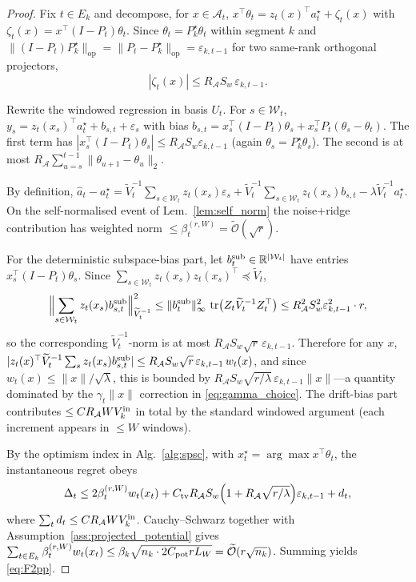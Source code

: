 \documentclass{article}
\newcommand{\R}{\mathbb{R}}
\newcommand{\op}{\mathrm{op}}
\newcommand{\cA}{\mathcal{A}}
\newcommand{\cW}{\mathcal{W}}
\newcommand{\tilO}{\widetilde{\mathcal{O}}}
\DeclareMathOperator{\tr}{tr}
\begin{document}
\begin{proof}
Fix $t\in E_k$ and decompose, for $x\in\cA_t$,
$x^\top\theta_t = z_t(x)^\top a_t^\star + \zeta_t(x)$ with
$\zeta_t(x)=x^\top(I-P_t)\theta_t$. Since $\theta_t=P_k^\star\theta_t$
within segment $k$ and $\|(I-P_t)P_k^\star\|_{\op}=\|P_t-P_k^\star\|_{\op}=\varepsilon_{k,t-1}$
for two same-rank orthogonal projectors,
\begin{equation}|\zeta_t(x)|\le R_\cA S_w\,\varepsilon_{k,t-1}.\label{eq:zeta}\end{equation}

Rewrite the windowed regression in basis $U_t$. For $s\in\cW_t$,
$y_s=z_t(x_s)^\top a_t^\star+b_{s,t}+\varepsilon_s$ with bias
$b_{s,t}=x_s^\top(I-P_t)\theta_s + x_s^\top P_t(\theta_s-\theta_t)$.
The first term has $|x_s^\top(I-P_t)\theta_s|\le R_\cA S_w\varepsilon_{k,t-1}$
(again $\theta_s=P_k^\star\theta_s$). The second is at most
$R_\cA\sum_{u=s}^{t-1}\|\theta_{u+1}-\theta_u\|_2$.

By definition,
$\widehat a_t-a_t^\star
= \widetilde V_t^{-1}\sum_{s\in\cW_t}z_t(x_s)\varepsilon_s
+ \widetilde V_t^{-1}\sum_{s\in\cW_t}z_t(x_s)b_{s,t}
- \lambda\widetilde V_t^{-1}a_t^\star.$
On the self-normalised event of Lem.~\ref{lem:self_norm} the noise+ridge contribution has weighted norm
$\le \beta_t^{(r,W)}=\tilO(\sqrt r)$.

For the deterministic subspace-bias part, let $b_t^{\rm sub}\in\R^{|\cW_t|}$
have entries $x_s^\top(I-P_t)\theta_s$. Since
$\sum_{s\in\cW_t}z_t(x_s)z_t(x_s)^\top\preceq\widetilde V_t$,
\[
\Bigl\|\sum_{s\in\cW_t}z_t(x_s)b_{s,t}^{\rm sub}\Bigr\|_{\widetilde V_t^{-1}}^2
\le \|b_t^{\rm sub}\|_\infty^2\,\tr\bigl(Z_t\widetilde V_t^{-1}Z_t^\top\bigr)
\le R_\cA^2 S_w^2\varepsilon_{k,t-1}^2\cdot r,
\]
so the corresponding $\widetilde V_t^{-1}$-norm is at most
$R_\cA S_w\sqrt r\,\varepsilon_{k,t-1}$. Therefore for any $x$,
$|z_t(x)^\top\widetilde V_t^{-1}\sum_s z_t(x_s)b_{s,t}^{\rm sub}|
\le R_\cA S_w\sqrt r\,\varepsilon_{k,t-1}\,w_t(x)$, and since
$w_t(x)\le\|x\|/\sqrt\lambda$, this is bounded by
$R_\cA S_w\sqrt{r/\lambda}\,\varepsilon_{k,t-1}\|x\|$---a quantity
dominated by the $\gamma_t\|x\|$ correction in
\eqref{eq:gamma_choice}.
The drift-bias part contributes $\le C R_\cA W V_k^{\rm in}$ in total
by the standard windowed argument (each increment appears in $\le W$
windows).

By the optimism index in Alg.~\ref{alg:spsc}, with
$x_t^\star=\arg\max x^\top\theta_t$, the instantaneous regret obeys
\[
\Delta_t \le 2\beta_t^{(r,W)}w_t(x_t)
+ C_{\rm tv}R_\cA S_w\Bigl(1+R_\cA\sqrt{r/\lambda}\Bigr)\varepsilon_{k,t-1}
+ d_t,
\]
where $\sum_t d_t\le C R_\cA W V_k^{\rm in}$.
Cauchy--Schwarz together with
Assumption~\ref{ass:projected_potential} gives
$\sum_{t\in E_k}\beta_t^{(r,W)}w_t(x_t)
\le \beta_k\sqrt{n_k\cdot 2C_{\rm pot}r L_W}=\tilO(r\sqrt{n_k})$.
Summing yields \eqref{eq:F2pp}.
\end{proof}
\end{document}

